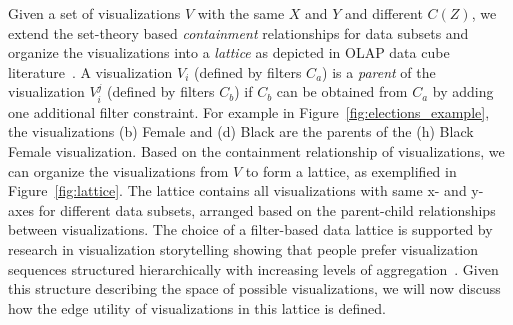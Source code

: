 \npar Given a set of visualizations $V$ with the same $X$ and $Y$ and different $C(Z)$, we extend the set-theory based \emph{containment} relationships for data subsets and organize the visualizations into a \textit{lattice} as depicted in OLAP data cube literature~\cite{Xin2007}. A visualization $V_i$ (defined by filters $C_a$) is a \textit{parent} of the visualization $V_i^j$ (defined by filters $C_b$) if $C_b$ can be obtained from $C_a$ by adding one additional filter constraint. For example in Figure~\ref{fig:elections_example}, the visualizations (b) Female and (d) Black are the parents of the (h) Black Female visualization. Based on the containment relationship of visualizations, we can organize the visualizations from $V$ to form a lattice, as exemplified in Figure~\ref{fig:lattice}. The lattice contains all visualizations with same x- and y- axes for different data subsets, arranged based on the parent-child relationships between visualizations. The choice of a filter-based data lattice is supported by research in visualization storytelling showing that people prefer visualization sequences structured hierarchically with increasing levels of aggregation~\cite{Kim2017,Hullman2017,Hullman2013}. Given this structure describing the space of possible visualizations, we will now discuss how the edge utility of visualizations in this lattice is defined.

